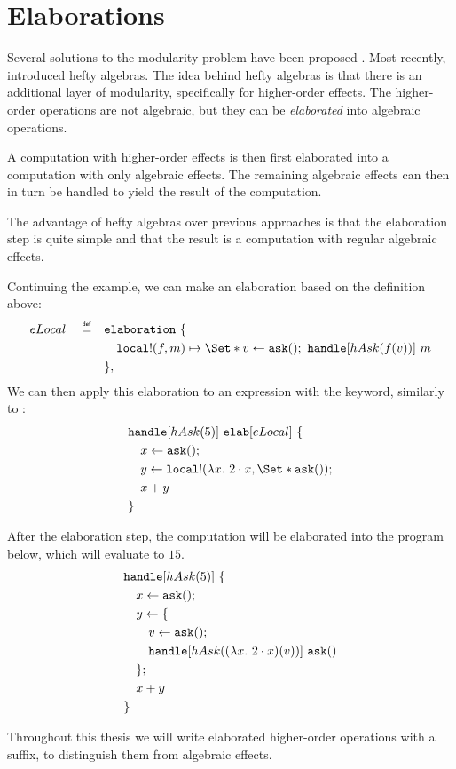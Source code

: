 \section{Elaborations}\label{sec:elab}

Several solutions to the modularity problem have been proposed \autocite{wu_effect_2014,oh_latent_2021}. Most recently, \textcite{bach_poulsen_hefty_2023} introduced hefty algebras. The idea behind hefty algebras is that there is an additional layer of modularity, specifically for higher-order effects. The higher-order operations are not algebraic, but they can be \emph{elaborated} into algebraic operations.

A computation with higher-order effects is then first elaborated into a computation with only algebraic effects. The remaining algebraic effects can then in turn be handled to yield the result of the computation.

The advantage of hefty algebras over previous approaches is that the elaboration step is quite simple and that the result is a computation with regular algebraic effects.

Continuing the \olocal example, we can make an elaboration based on the definition above:
\begin{align*}
    eLocal \quad\defeq\quad
        &\elaboration\ \{ \\
        &\quad\olocal!(f, m) \mapsto \S{v \gets \oask()\seq \handle[hAsk(f(v))]\ m }\\
        &\},
\end{align*}
We can then apply this elaboration to an expression with the \elab keyword, similarly to \handle:
\begin{align*}
    &\handle[hAsk(5)]\ \elab[eLocal]\ \{ \\
    &\quad x \gets \oask();\\
    &\quad y \gets \olocal!(\lambda x.\ 2\cdot x, \S{ \oask() });\\
    &\quad x + y \\
    &\}
\end{align*}

After the elaboration step, the computation will be elaborated into the program below, which will evaluate to $15$.
\begin{align*}
    &\text{\texttt{handle}}[hAsk(5)]\ \{ \\
    &\quad x \gets \mathtt{ask}();\\
    &\quad y \gets \{\\
    &\quad\quad v \gets \mathtt{ask}();\\
    &\quad\quad \text{\texttt{handle}}[hAsk((\lambda x.\ 2\cdot x)(v))]\ \mathtt{ask}()\\
    &\quad\};\\
    &\quad x + y \\
    &\}
\end{align*}

Throughout this thesis we will write elaborated higher-order operations with a \code{!} suffix, to distinguish them from algebraic effects.

